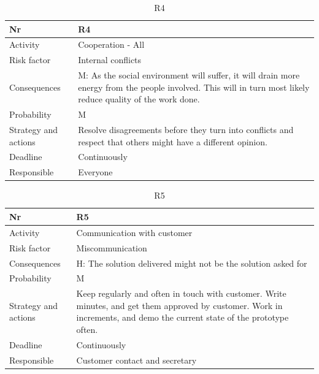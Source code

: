 \documentclass[11pt]{book}
\begin{document}
\begin{table}[H]
\centering
\begin{tabular}{ l  p{11cm} }
	Nr						& R4 																		\\ \hline
	Activity				& Cooperation - All  														\\ \hline
	Risk factor				& Internal conflicts 														\\ \hline
	Consequences			& M: As the social environment will suffer, it will drain more energy from 
								the people involved. This will in turn most likely reduce quality of 
								the work done. 															\\ \hline
	Probability				& M 																		\\ \hline
	Strategy and actions	& Resolve disagreements before they turn into conflicts and respect that 
								others might have a different opinion. 									\\ \hline
	Deadline				& Continuously 																\\ \hline
	Responsible				& Everyone 																	\\ 
\end{tabular}
\label{tab:risk_4}
\caption{R4}
\end{table}

\begin{table}[H]
\centering
\begin{tabular}{ l  p{11cm} }
	Nr						& R5 																		\\ \hline
	Activity				& Communication with customer 												\\ \hline
	Risk factor				& Miscommunication 															\\ \hline
	Consequences			& H: The solution delivered might not be the solution asked for 			\\ \hline
	Probability				& M 																		\\ \hline
	Strategy and actions	& Keep regularly and often in touch with customer. Write minutes, and get 
								them approved by customer. Work in increments, and demo the current 
								state of the prototype often. 											\\ \hline
	Deadline				& Continuously 																\\ \hline
	Responsible				& Customer contact and secretary 											\\ 
\end{tabular}
\label{tab:risk_5}
\caption{R5}
\end{table}
\end{document}
